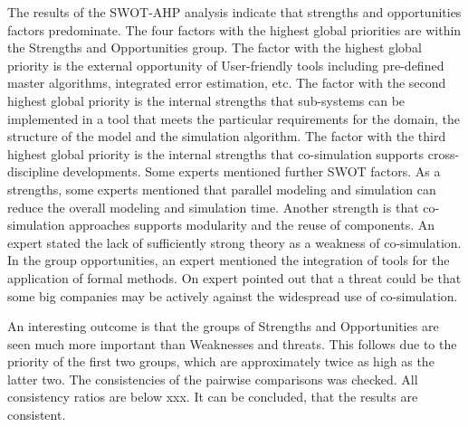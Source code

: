 The results of the SWOT-AHP analysis indicate that strengths and opportunities factors predominate. The four factors with the highest global priorities are within the Strengths and Opportunities group. The factor with the highest global priority is the external opportunity of User-friendly tools including pre-defined master algorithms, integrated error estimation, etc. The factor with the second highest global priority is the internal strengths that sub-systems can be implemented in a tool that meets the particular requirements for the domain, the structure of the model and the simulation algorithm. The factor with the third highest global priority is the internal strengths that co-simulation supports cross-discipline developments. Some experts mentioned further SWOT factors. As a strengths, some experts mentioned that parallel modeling and simulation can reduce the overall modeling and simulation time. Another strength is that co-simulation approaches supports modularity and the reuse of components. An expert stated the lack of sufficiently strong theory as a weakness of co-simulation. In the group opportunities, an expert mentioned the integration of tools for the application of formal methods. On expert pointed out that a threat could be that some big companies may be actively against the widespread use of co-simulation.

An interesting outcome is that the groups of Strengths and Opportunities are seen much more important than Weaknesses and threats. This follows due to the priority of the first two groups, which are approximately twice as high as the latter two. The consistencies of the pairwise comparisons was checked. All consistency ratios are below xxx. It can be concluded, that the results are consistent. 






